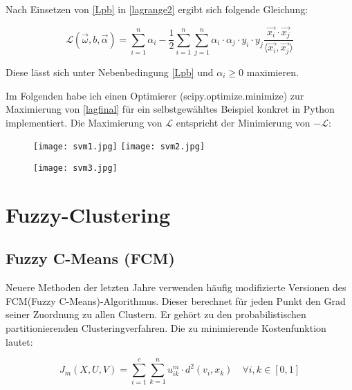 \documentclass[11pt,ceqn]{book}
\begin{document}
Nach Einsetzen von \eqref{Lpb} in \eqref{lagrange2} ergibt sich folgende Gleichung:

\begin{equation} \label{lagfinal}
\mathcal{L}(\vec{\omega},b,\vec{\alpha}) = \sum_{i=1}^n \alpha_i - \frac{1}{2} \sum_{i=1}^n \sum_{j=1}^n \alpha_i \cdot \alpha_j \cdot y_i \cdot y_j \frac{\vec{x_i} \cdot \vec{x_j}}{ \langle \vec{x_i},  \vec{x_j} \rangle}
\end{equation}

Diese lässt sich unter Nebenbedingung \eqref{Lpb} und $\alpha_i \geqslant 0$ maximieren.

\vspace*{\fill}

Im Folgenden habe ich einen Optimierer (scipy.optimize.minimize) zur Maximierung von \eqref{lagfinal} für ein selbstgewähltes Beispiel konkret in Python implementiert. Die Maximierung von $\mathcal{L}$ entspricht der Minimierung von $-\mathcal{L}$:


\begin{figure}[H]
\centering
\texttt{[image: svm1.jpg]}
\texttt{[image: svm2.jpg]}
\end{figure}
\begin{figure}[H]
\centering
\texttt{[image: svm3.jpg]}
\end{figure}


\hfill

\section{Fuzzy-Clustering}

\subsection{Fuzzy C-Means (FCM)}
Neuere Methoden der letzten Jahre verwenden häufig modifizierte Versionen des FCM(Fuzzy C-Means)-Algorithmus\cite{clustgis}. Dieser berechnet für jeden Punkt den Grad seiner Zuordnung zu allen Clustern. Er gehört zu den probabilistischen partitionierenden Clusteringverfahren.
Die zu minimierende Kostenfunktion lautet:

$$J_m(X,U,V) = \sum_{i=1}^{c} \sum_{k=1}^{n} u_{ik}^m \cdot d^2(v_i,x_k) \quad \forall i,k \in [0,1]$$
\end{document}
